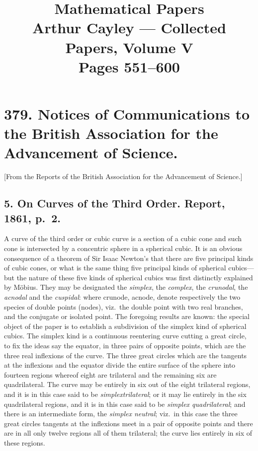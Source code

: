 \documentclass[11pt,a4paper]{article}
\title{\textbf{Mathematical Papers}\\\Large Arthur Cayley --- Collected Papers, Volume V\\\normalsize Pages 551--600}
\author{}
\date{}
\begin{document}
\maketitle
\thispagestyle{empty}

\tableofcontents
\newpage


\section*{379. Notices of Communications to the British Association for the Advancement of Science.}

[From the Reports of the British Association for the Advancement of Science.]

\subsection*{5. On Curves of the Third Order. Report, 1861, p.~2.}

A curve of the third order or cubic curve is a section of a cubic cone and such
cone is intersected by a concentric sphere in a spherical cubic. It is an obvious
consequence of a theorem of Sir Isaac Newton's that there are five principal kinds
of cubic cones, or what is the same thing five principal kinds of spherical cubics---
but the nature of these five kinds of spherical cubics was first distinctly explained by
M\"{o}bius. They may be designated the \textit{simplex}, the \textit{complex}, the \textit{crunodal}, the \textit{acnodal}
and the \textit{cuspidal}: where crunode, acnode, denote respectively the two species of double
points (nodes), viz.\ the double point with two real branches, and the conjugate or
isolated point. The foregoing results are known: the special object of the paper is
to establish a subdivision of the simplex kind of spherical cubics. The simplex kind
is a continuous reentering curve cutting a great circle, to fix the ideas say the
equator, in three pairs of opposite points, which are the three real inflexions of the
curve. The three great circles which are the tangents at the inflexions and the
equator divide the entire surface of the sphere into fourteen regions whereof eight
are trilateral and the remaining six are quadrilateral. The curve may be entirely in
six out of the eight trilateral regions, and it is in this case said to be \textit{simplex\noindent trilateral}; or it may lie entirely in the six quadrilateral regions, and it is in this
case said to be \textit{simplex quadrilateral}; and there is an intermediate form, the \textit{simplex neutral}; viz.\ in this case the three great circles tangents at the inflexions meet in
a pair of opposite points and there are in all only twelve regions all of them
trilateral; the curve lies entirely in six of these regions.
\end{document}
